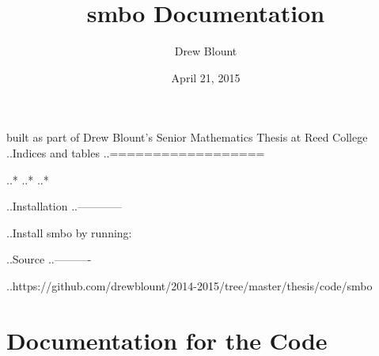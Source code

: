 \documentclass[letterpaper,10pt,english]{sphinxmanual}
\title{smbo Documentation}
\date{April 21, 2015}
\author{Drew Blount}
\begin{document}
\maketitle
\tableofcontents
{}\label{index::doc}


built as part of Drew Blount's Senior Mathematics Thesis at Reed College
\label{index:module-smbo}
..Indices and tables
..==================

..* 
..* 
..* 

..Installation
..------------

..Install smbo by running:

..Source
..----------

..https://github.com/drewblount/2014-2015/tree/master/thesis/code/smbo


\chapter{Documentation for the Code}
\label{index:module-smbo.smb_optimizer}\label{index:smbo-a-tool-for-sequential-model-based-optimization}\label{index:documentation-for-the-code}\label{index:module-smb_optimizer}
\end{document}
